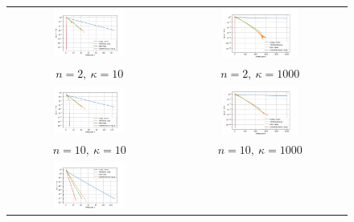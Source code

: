 \documentclass[a4paper]{article}
\begin{document}
\begin{figure}[H]
  \centering
  \begin{tabular}{cc}
    \includegraphics[width=0.45\textwidth]{images/task1_2_10.png} &
    \includegraphics[width=0.45\textwidth]{images/task1_2_1000.png} \\[1ex]
    \(n=2,\ \kappa=10\) & \(n=2,\ \kappa=1000\) \\[2ex]
    \includegraphics[width=0.45\textwidth]{images/task1_10_10.png} &
    \includegraphics[width=0.45\textwidth]{images/task1_10_1000.png} \\[1ex]
    \(n=10,\ \kappa=10\) & \(n=10,\ \kappa=1000\) \\[2ex]
    \includegraphics[width=0.45\textwidth]{images/task1_100_10.png} &

\end{tabular}
\end{figure}
\end{document}
